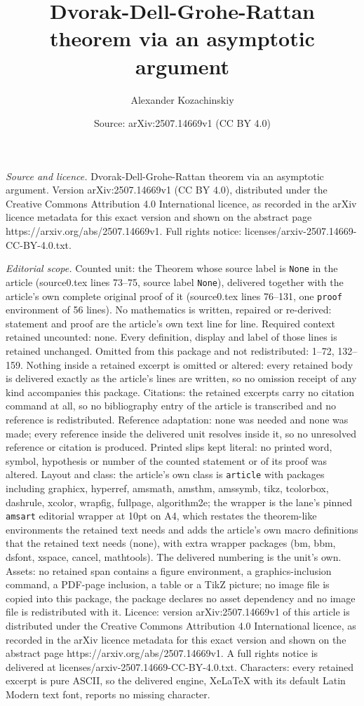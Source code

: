 \documentclass[10pt,a4paper]{amsart}
\title[Dvorak-Dell-Grohe-Rattan theorem via an asymptotic argument]{Dvorak-Dell-Grohe-Rattan theorem via an asymptotic argument}
\author{Alexander Kozachinskiy}
\date{Source: arXiv:2507.14669v1 (CC BY 4.0)}
\begin{document}
\maketitle

\noindent\emph{Source and licence.} Dvorak-Dell-Grohe-Rattan theorem via an asymptotic argument. Version arXiv:2507.14669v1 (CC BY 4.0), distributed under the Creative Commons Attribution 4.0 International licence, as recorded in the arXiv licence metadata for this exact version and shown on the abstract page https://arxiv.org/abs/2507.14669v1. Full rights notice: licenses/arxiv-2507.14669-CC-BY-4.0.txt.\par\smallskip

\noindent\textit{Editorial scope.} Counted unit: the Theorem whose source label is \texttt{None} in the article (source0.tex lines 73--75, source label \texttt{None}), delivered together with the article's own complete original proof of it (source0.tex lines 76--131, one \texttt{proof} environment of 56 lines). No mathematics is written, repaired or re-derived: statement and proof are the article's own text line for line. Required context retained uncounted: none. Every definition, display and label of those lines is retained unchanged. Omitted from this package and not redistributed: 1--72, 132--159. Nothing inside a retained excerpt is omitted or altered: every retained body is delivered exactly as the article's lines are written, so no omission receipt of any kind accompanies this package. Citations: the retained excerpts carry no citation command at all, so no bibliography entry of the article is transcribed and no reference is redistributed. Reference adaptation: none was needed and none was made; every reference inside the delivered unit resolves inside it, so no unresolved reference or citation is produced. Printed slips kept literal: no printed word, symbol, hypothesis or number of the counted statement or of its proof was altered. Layout and class: the article's own class is \texttt{article} with packages including graphicx, hyperref, amsmath, amsthm, amssymb, tikz, tcolorbox, dashrule, xcolor, wrapfig, fullpage, algorithm2e; the wrapper is the lane's pinned \texttt{amsart} editorial wrapper at 10pt on A4, which restates the theorem-like environments the retained text needs and adds the article's own macro definitions that the retained text needs (none), with extra wrapper packages (bm, bbm, dsfont, xspace, cancel, mathtools). The delivered numbering is the unit's own. Assets: no retained span contains a figure environment, a graphics-inclusion command, a PDF-page inclusion, a table or a TikZ picture; no image file is copied into this package, the package declares no asset dependency and no image file is redistributed with it. Licence: version arXiv:2507.14669v1 of this article is distributed under the Creative Commons Attribution 4.0 International licence, as recorded in the arXiv licence metadata for this exact version and shown on the abstract page https://arxiv.org/abs/2507.14669v1. A full rights notice is delivered at licenses/arxiv-2507.14669-CC-BY-4.0.txt. Characters: every retained excerpt is pure ASCII, so the delivered engine, XeLaTeX with its default Latin Modern text font, reports no missing character.
\end{document}

